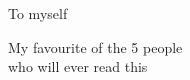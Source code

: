 \cleardoublepage
\thispagestyle{empty}
{}

\vspace*{3cm}

\begin{center}
    To myself
\end{center}

\medskip

\begin{center}
    My favourite of the 5 people\\who will ever read this
\end{center}